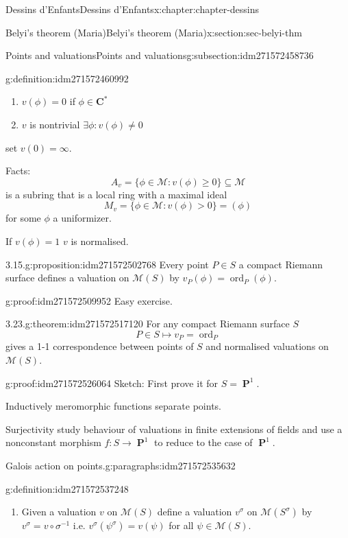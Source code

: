 \documentclass[oneside,10pt,]{book}
\numberwithin{equation}{section}
\newcommand{\CC}{\mathbf{C}}
\DeclareMathOperator{\ord}{ord}
\DeclareMathOperator{\PP}{\mathbf{P}}
\newcommand{\gt}{>}
\begin{document}
\begin{chapterptx}{Dessins d'Enfants}{}{Dessins d'Enfants}{}{}{x:chapter:chapter-dessins}
\begin{sectionptx}{Belyi's theorem (Maria)}{}{Belyi's theorem (Maria)}{}{}{x:section:sec-belyi-thm}
\begin{subsectionptx}{Points and valuations}{}{Points and valuations}{}{}{g:subsection:idm271572458736}
\begin{definition}{}{g:definition:idm271572460992}
\begin{enumerate}
\item{}\(v(\phi) = 0 \) if \(\phi \in \CC^*\)%
\item{}\(v\) is nontrivial \(\exists \phi : v(\phi)\ne 0\)%
\end{enumerate}
set \(v(0) = \infty\).%
\end{definition}
Facts:%
\begin{equation*}
A_v = \{\phi \in \mathcal M : v(\phi) \ge 0 \} \subseteq \mathcal M
\end{equation*}
is a subring that is a local ring with a maximal ideal%
\begin{equation*}
M_v = \{ \phi\in \mathcal M : v(\phi) \gt 0\} = (\phi)
\end{equation*}
for some \(\phi\) a uniformizer.%
\par
If \(v(\phi) = 1\) \(v\) is normalised.%
\begin{proposition}{3.15.}{}{g:proposition:idm271572502768}%
Every point \(P \in S\) a compact Riemann surface defines a valuation on \(\mathcal M(S)\) by \(v_P(\phi) = \ord_P(\phi)\).%
\end{proposition}
\begin{proofptx}{}{g:proof:idm271572509952}
Easy exercise.%
\end{proofptx}
\begin{theorem}{3.23.}{}{g:theorem:idm271572517120}%
For any compact Riemann surface \(S\)%
\begin{equation*}
P\in S \mapsto v_P = \ord_P
\end{equation*}
gives a 1-1 correspondence between points of \(S\) and normalised valuations on \(\mathcal M(S)\).%
\end{theorem}
\begin{proofptx}{}{g:proof:idm271572526064}
Sketch: First prove it for \(S = \PP^1\).%
\par
Inductively meromorphic functions separate points.%
\par
Surjectivity study behaviour of valuations in finite extensions of fields and use a nonconstant morphism \(f\colon S \to \PP^1\) to reduce to the case of \(\PP^1\).%
\end{proofptx}
\begin{paragraphs}{Galois action on points.}{g:paragraphs:idm271572535632}%
\begin{definition}{}{g:definition:idm271572537248}%
%
\begin{enumerate}
\item{}Given a valuation \(v\) on \(\mathcal M(S)\) define a valuation \(v^\sigma\) on \(\mathcal M(S^\sigma)\) by \(v^\sigma = v\circ \sigma^{-1}\) i.e. \(v^\sigma(\psi^\sigma) = v(\psi)\) for all \(\psi \in \mathcal M(S)\).%

\end{enumerate}
\end{definition}
\end{paragraphs}
\end{subsectionptx}
\end{sectionptx}
\end{chapterptx}
\end{document}
